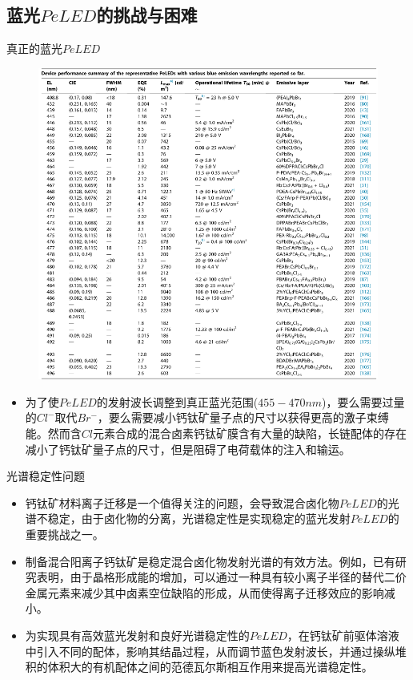 \documentclass{beamer}[fontset=windows]
\begin{document}
\subsection{蓝光$PeLED$的挑战与困难}
\begin{frame}
\begin{block}{真正的蓝光$PeLED$}
	\begin{figure}[H]
		\centering
		\hspace{2em}\includegraphics[width=.56\linewidth]{pic/10.png}
	\end{figure}
\begin{itemize}
\item \tiny{为了使$PeLED$的发射波长调整到真正蓝光范围($455-470nm$)，要么需要过量的$Cl^{-}$取代$Br^{-}$，要么需要减小钙钛矿量子点的尺寸以获得更高的激子束缚能。然而含$Cl$元素合成的混合卤素钙钛矿膜含有大量的缺陷，长链配体的存在减小了钙钛矿量子点的尺寸，但是阻碍了电荷载体的注入和输运。}
\end{itemize}
\end{block}
\end{frame}
\begin{frame}
\begin{block}{光谱稳定性问题}
\begin{itemize}
\item 钙钛矿材料离子迁移是一个值得关注的问题，会导致混合卤化物$PeLED$的光谱不稳定，由于卤化物的分离，光谱稳定性是实现稳定的蓝光发射$PeLED$的重要挑战之一。
\item 制备混合阳离子钙钛矿是稳定混合卤化物发射光谱的有效方法。例如，已有研究表明，由于晶格形成能的增加，可以通过一种具有较小离子半径的替代二价金属元素来减少其中卤素空位缺陷的形成，从而使得离子迁移效应的影响减小。
\item 为实现具有高效蓝光发射和良好光谱稳定性的$PeLED$，在钙钛矿前驱体溶液中引入不同的配体，影响其结晶过程，从而调节蓝色发射波长，并通过操纵堆积的体积大的有机配体之间的范德瓦尔斯相互作用来提高光谱稳定性。
\end{itemize}
\end{block}
\end{frame}
\end{document}
